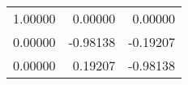 \begin{tabular}{rrr}
\toprule
1.00000 &  0.00000 &  0.00000 \\
0.00000 & -0.98138 & -0.19207 \\
0.00000 &  0.19207 & -0.98138 \\
\bottomrule
\end{tabular}
